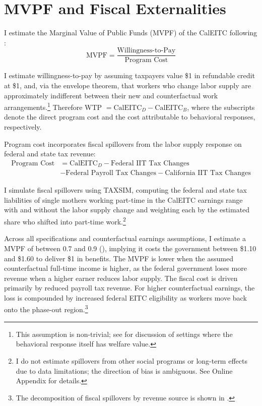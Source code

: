 \documentclass[11pt]{article}
\let\Cref\crtCref
\begin{document}

\section{MVPF and Fiscal Externalities} \label{sec:mvpf}

I estimate the Marginal Value of Public Funds (MVPF) of the CalEITC following \cite{hendren_unified_2020}:
\begin{equation}
    \label{eq:mvpf}
    \text{MVPF} = \frac{\text{Willingness-to-Pay}}{\text{Program Cost}}
\end{equation}

I estimate willingness-to-pay by assuming taxpayers value \$1 in refundable credit at \$1, and, via the envelope theorem, that workers who change labor supply are approximately indifferent between their new and counterfactual work arrangements.\footnote{This assumption is non-trivial; see \cite{lockwood_optimal_2020} for discussion of settings where the behavioral response itself has welfare value.} Therefore WTP $= \text{CalEITC}_D - \text{CalEITC}_B$, where the subscripts denote the direct program cost and the cost attributable to behavioral responses, respectively.

Program cost incorporates fiscal spillovers from the labor supply response on federal and state tax revenue:
\begin{equation}
\begin{split}
\text{Program Cost} & = \text{CalEITC}_D - \text{Federal IIT Tax Changes} \\
  & - \text{Federal Payroll Tax Changes} - \text{California IIT Tax Changes}
\end{split}
\end{equation}

I simulate fiscal spillovers using TAXSIM, computing the federal and state tax liabilities of single mothers working part-time in the CalEITC earnings range with and without the labor supply change and weighting each by the estimated share who shifted into part-time work.\footnote{I do not estimate spillovers from other social programs or long-term effects due to data limitations; the direction of bias is ambiguous. See Online Appendix for details.}


Across all specifications and counterfactual earnings assumptions, I estimate a MVPF of between 0.7 and 0.9 (\Cref{fig:fig_hist_2017_f1_mvpf}), implying it costs the government between \$1.10 and \$1.60 to deliver \$1 in benefits. The MVPF is lower when the assumed counterfactual full-time income is higher, as the federal government loses more revenue when a higher earner reduces labor supply. The fiscal cost is driven primarily by reduced payroll tax revenue. For higher counterfactual earnings, the loss is compounded by increased federal EITC eligibility as workers move back onto the phase-out region.\footnote{The decomposition of fiscal spillovers by revenue source is shown in \Cref{fig:appA_fiscal_spill}.}
\end{document}
